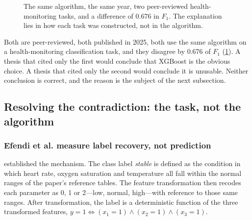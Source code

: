 \documentclass[12pt,a4paper,oneside]{report}
\begin{document}
\begin{figure}[htbp]
\centering
{}
\caption{The same algorithm, the same year, two peer-reviewed health-monitoring tasks, and a difference of 0.676 in $F_1$. The explanation lies in how each task was constructed, not in the algorithm.}\label{fig:xgb-contradiction}
\end{figure}

Both are peer-reviewed, both published in 2025, both use the same algorithm on a health-monitoring classification task, and they disagree by 0.676 of $F_1$ (\cref{fig:xgb-contradiction}). A thesis that cited only the first would conclude that XGBoost is the obvious choice. A thesis that cited only the second would conclude it is unusable. Neither conclusion is correct, and the reason is the subject of the next subsection.

\subsection{Resolving the contradiction: the task, not the algorithm}\label{sec:task-not-algo}

\subsubsection{Efendi et al. measure label recovery, not prediction}

 established the mechanism. The class label \emph{stable} is defined as the condition in which heart rate, oxygen saturation and temperature all fall within the normal ranges of the paper's reference tables. The feature transformation then recodes each parameter as 0, 1 or 2---low, normal, high---with reference to those same ranges. After transformation, the label is a deterministic function of the three transformed features, $y = 1 \iff (x_1 = 1) \wedge (x_2 = 1) \wedge (x_3 = 1)$.
\end{document}
